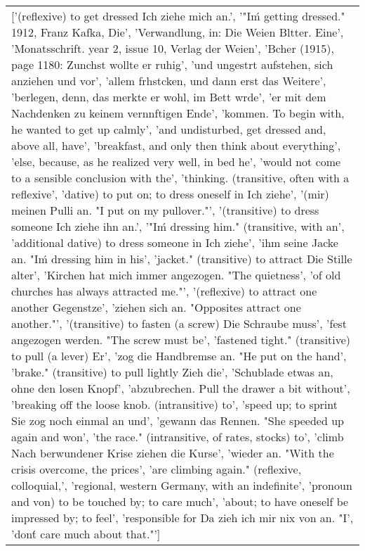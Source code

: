 \documentclass[a4paper,backgrid,frontgrid]{flacards}
\begin{document}
{\begin{tabular}{l}
\parbox[t][][t]{8cm}{\normalfont \small ['(reflexive) to get dressed Ich ziehe mich an.', '"I\'m getting dressed." 1912, Franz Kafka, Die', 'Verwandlung, in: Die Weien Bltter. Eine', 'Monatsschrift. year 2, issue 10, Verlag der Weien', 'Bcher (1915), page 1180: Zunchst wollte er ruhig', 'und ungestrt aufstehen, sich anziehen und vor', 'allem frhstcken, und dann erst das Weitere', 'berlegen, denn, das merkte er wohl, im Bett wrde', 'er mit dem Nachdenken zu keinem vernnftigen Ende', 'kommen. To begin with, he wanted to get up calmly', 'and undisturbed, get dressed and, above all, have', 'breakfast, and only then think about everything', 'else, because, as he realized very well, in bed he', 'would not come to a sensible conclusion with the', 'thinking. (transitive, often with a reflexive', 'dative) to put on; to dress oneself in Ich ziehe', '(mir) meinen Pulli an.  "I put on my pullover."', '(transitive) to dress someone Ich ziehe ihn an.', '"I\'m dressing him." (transitive, with an', 'additional dative) to dress someone in Ich ziehe', 'ihm seine Jacke an.  "I\'m dressing him in his', 'jacket." (transitive) to attract Die Stille alter', 'Kirchen hat mich immer angezogen. "The quietness', 'of old churches has always attracted me."', '(reflexive) to attract one another Gegenstze', 'ziehen sich an.  "Opposites attract one another."', '(transitive) to fasten (a screw) Die Schraube muss', 'fest angezogen werden.  "The screw must be', 'fastened tight." (transitive) to pull (a lever) Er', 'zog die Handbremse an.  "He put on the hand', 'brake." (transitive) to pull lightly Zieh die', 'Schublade etwas an, ohne den losen Knopf', 'abzubrechen. Pull the drawer a bit without', 'breaking off the loose knob. (intransitive) to', 'speed up; to sprint Sie zog noch einmal an und', 'gewann das Rennen.  "She speeded up again and won', 'the race." (intransitive, of rates, stocks) to', 'climb Nach berwundener Krise ziehen die Kurse', 'wieder an.  "With the crisis overcome, the prices', 'are climbing again." (reflexive, colloquial,', 'regional, western Germany, with an indefinite', 'pronoun and von) to be touched by; to care much', 'about; to have oneself be impressed by; to feel', 'responsible for Da zieh ich mir nix von an.  "I', 'don\'t care much about that."'] }\\
\end{tabular}
}
\end{document}
